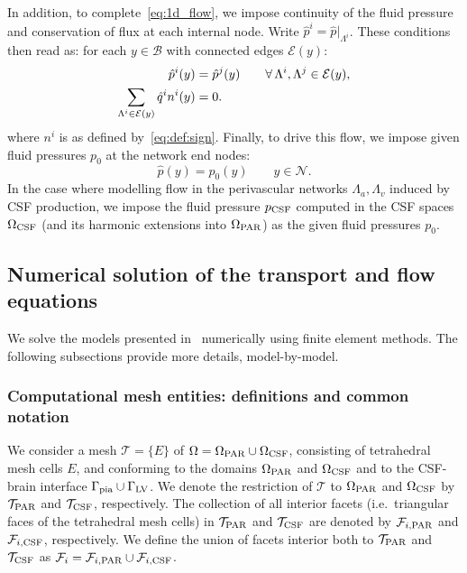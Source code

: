 In addition, to complete~\eqref{eq:1d_flow}, we impose continuity of
the fluid pressure and conservation of flux at each internal node. Write
$\hat{p}^i = \hat{p}|_{\Lambda^i}$. These conditions then read as: for
each $y \in \mathcal{B}$ with connected edges $\mathcal{E}(y)$:
\begin{subequations}
\begin{align}
  \hat{p}^i(y) &= \hat{p}^j(y) \qquad \forall \, \Lambda^i, \Lambda^j \in \mathcal{E}(y), \\
  \sum_{\Lambda^i \in \mathcal{E}(y)} \hat{q}^i n^i(y) &= 0  .
\end{align}
\label{eq:1d_flow:bifurcations}
\end{subequations}
where $n^i$ is as defined by~\eqref{eq:def:sign}. Finally, to drive this flow, we impose given fluid pressures $p_0$ at the
network end nodes:
\begin{equation}
  \hat{p}(y) = p_0(y) \qquad y \in \mathcal{N} .
  \label{eq:1d_flow:bcs}
\end{equation}
In the case where modelling flow in the perivascular networks
$\Lambda_a, \Lambda_v$ induced by CSF production, we impose the fluid
pressure $p_{\rm CSF}$ computed in the CSF spaces $\Omega_{\rm CSF}$
(and its harmonic extensions into $\Omega_{\rm PAR}$) as the given
fluid pressures $p_0$.

\subsection{Numerical solution of the transport and flow equations}
\label{sec:details_numerical_method}

We solve the models presented in~ numerically
using finite element methods. The following subsections provide more
details, model-by-model.

\subsubsection{Computational mesh entities: definitions and common notation}

We consider a mesh $\mathcal{T} = \{ E \}$ of $\Omega = \Omega_{\rm
  PAR} \cup \Omega_{\rm CSF}$, consisting of tetrahedral mesh cells
$E$, and conforming to the domains $\Omega_{\rm PAR}$ and $\Omega_{\rm
  CSF}$ and to the CSF-brain interface $\Gamma_{\rm pia} \cup
\Gamma_{\rm LV}$. We denote the restriction of $\mathcal{T}$ to
$\Omega_{\rm PAR}$ and $\Omega_{\rm CSF}$ by $\mathcal{T}_{\rm PAR}$
and $\mathcal{T}_{\rm CSF}$, respectively. The collection of all
interior facets (i.e.~triangular faces of the tetrahedral mesh cells)
in $\mathcal{T}_{\rm PAR}$ and $\mathcal{T}_{\rm CSF}$ are denoted by
$\mathcal{F}_{i, \rm PAR}$ and $\mathcal{F}_{i, \rm CSF}$,
respectively. We define the union of facets interior both to
$\mathcal{T}_{ \rm PAR}$ and $\mathcal{T}_{ \rm CSF}$ as
$\mathcal{F}_i = \mathcal{F}_{i, \rm PAR} \cup \mathcal{F}_{i, \rm
  CSF}$. 

